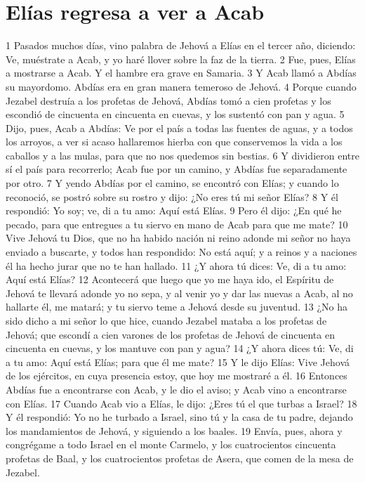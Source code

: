 \section*{Elías regresa a ver a Acab}


1 Pasados muchos días, vino palabra de Jehová a Elías en el tercer año, diciendo: Ve, muéstrate a Acab, y yo haré llover sobre la faz de la tierra.
2 Fue, pues, Elías a mostrarse a Acab. Y el hambre era grave en Samaria.
3 Y Acab llamó a Abdías su mayordomo. Abdías era en gran manera temeroso de Jehová.
4 Porque cuando Jezabel destruía a los profetas de Jehová, Abdías tomó a cien profetas y los escondió de cincuenta en cincuenta en cuevas, y los sustentó con pan y agua.
5 Dijo, pues, Acab a Abdías: Ve por el país a todas las fuentes de aguas, y a todos los arroyos, a ver si acaso hallaremos hierba con que conservemos la vida a los caballos y a las mulas, para que no nos quedemos sin bestias.
6 Y dividieron entre sí el país para recorrerlo; Acab fue por un camino, y Abdías fue separadamente por otro.
7 Y yendo Abdías por el camino, se encontró con Elías; y cuando lo reconoció, se postró sobre su rostro y dijo: ¿No eres tú mi señor Elías?
8 Y él respondió: Yo soy; ve, di a tu amo: Aquí está Elías.
9 Pero él dijo: ¿En qué he pecado, para que entregues a tu siervo en mano de Acab para que me mate?
10 Vive Jehová tu Dios, que no ha habido nación ni reino adonde mi señor no haya enviado a buscarte, y todos han respondido: No está aquí; y a reinos y a naciones él ha hecho jurar que no te han hallado.
11 ¿Y ahora tú dices: Ve, di a tu amo: Aquí está Elías?
12 Acontecerá que luego que yo me haya ido, el Espíritu de Jehová te llevará adonde yo no sepa, y al venir yo y dar las nuevas a Acab, al no hallarte él, me matará; y tu siervo teme a Jehová desde su juventud.
13 ¿No ha sido dicho a mi señor lo que hice, cuando Jezabel mataba a los profetas de Jehová; que escondí a cien varones de los profetas de Jehová de cincuenta en cincuenta en cuevas, y los mantuve con pan y agua?
14 ¿Y ahora dices tú: Ve, di a tu amo: Aquí está Elías; para que él me mate?
15 Y le dijo Elías: Vive Jehová de los ejércitos, en cuya presencia estoy, que hoy me mostraré a él.
16 Entonces Abdías fue a encontrarse con Acab, y le dio el aviso; y Acab vino a encontrarse con Elías.
17 Cuando Acab vio a Elías, le dijo: ¿Eres tú el que turbas a Israel?
18 Y él respondió: Yo no he turbado a Israel, sino tú y la casa de tu padre, dejando los mandamientos de Jehová, y siguiendo a los baales.
19 Envía, pues, ahora y congrégame a todo Israel en el monte Carmelo, y los cuatrocientos cincuenta profetas de Baal, y los cuatrocientos profetas de Asera, que comen de la mesa de Jezabel.
